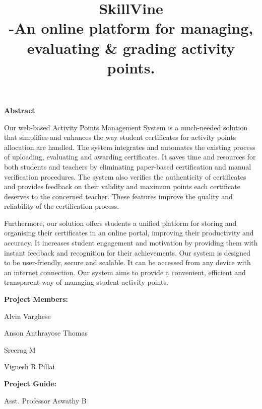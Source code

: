 \documentclass{article}
\title{\textbf{SkillVine} \\ \large -An online platform for managing, evaluating & grading activity points.}
\author{}
\date{}
\begin{document}
\maketitle

{\centering\textbf{\Large Abstract}\par}

\bigskip

\Large Our web-based Activity Points Management System is a much-needed
solution that simplifies and enhances the way student certificates for activity
points allocation are handled. The system integrates and automates the
existing process of uploading, evaluating and awarding certificates. It saves
time and resources for both students and teachers by eliminating paper-based
certification and manual verification procedures. The system also verifies the
authenticity of certificates and provides feedback on their validity and
maximum points each certificate deserves to the concerned teacher. These
features improve the quality and reliability of the certification process.
\par
\bigskip
\Large Furthermore, our solution offers students a unified platform for storing and
organising their certificates in an online portal, improving their productivity
and accuracy. It increases student engagement and motivation by providing
them with instant feedback and recognition for their achievements. Our
system is designed to be user-friendly, secure and scalable. It can be accessed
from any device with an internet connection. Our system aims to provide a
convenient, efficient and transparent way of managing student activity points.

\bigskip

{\large\textbf{Project Members:}}

Alvin Varghese

Anson Anthrayose Thomas

Sreerag M

Vignesh R Pillai

\bigskip

{\large\textbf{Project Guide:}}

Asst. Professor Aswathy B
\end{document}
